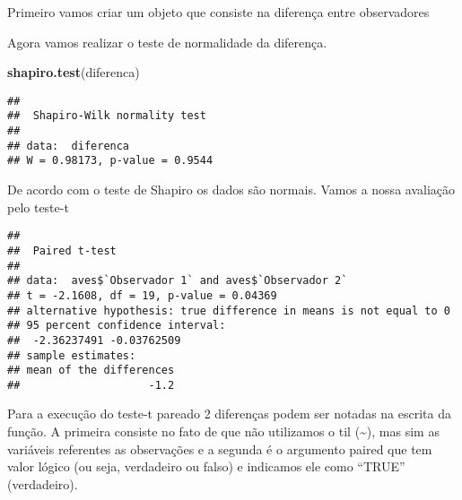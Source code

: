 \documentclass[]{book}
\newenvironment{Shaded}{\begin{snugshade}}{\end{snugshade}}
\newcommand{\DataTypeTok}[1]{\textcolor[rgb]{0.13,0.29,0.53}{#1}}
\newcommand{\FloatTok}[1]{\textcolor[rgb]{0.00,0.00,0.81}{#1}}
\newcommand{\KeywordTok}[1]{\textcolor[rgb]{0.13,0.29,0.53}{\textbf{#1}}}
\newcommand{\NormalTok}[1]{#1}
\newcommand{\OperatorTok}[1]{\textcolor[rgb]{0.81,0.36,0.00}{\textbf{#1}}}
\newcommand{\OtherTok}[1]{\textcolor[rgb]{0.56,0.35,0.01}{#1}}
\newcommand{\StringTok}[1]{\textcolor[rgb]{0.31,0.60,0.02}{#1}}
\begin{document}
Primeiro vamos criar um objeto que consiste na diferença entre observadores

\begin{Shaded}
\end{Shaded}

Agora vamos realizar o teste de normalidade da diferença.

\begin{Shaded}
\begin{Highlighting}[]
\KeywordTok{shapiro.test}\NormalTok{(diferenca)}
\end{Highlighting}
\end{Shaded}

\begin{verbatim}
## 
##  Shapiro-Wilk normality test
## 
## data:  diferenca
## W = 0.98173, p-value = 0.9544
\end{verbatim}

De acordo com o teste de Shapiro os dados são normais. Vamos a nossa avaliação pelo teste-t

\begin{Shaded}
\end{Shaded}

\begin{verbatim}
## 
##  Paired t-test
## 
## data:  aves$`Observador 1` and aves$`Observador 2`
## t = -2.1608, df = 19, p-value = 0.04369
## alternative hypothesis: true difference in means is not equal to 0
## 95 percent confidence interval:
##  -2.36237491 -0.03762509
## sample estimates:
## mean of the differences 
##                    -1.2
\end{verbatim}

Para a execução do teste-t pareado 2 diferenças podem ser notadas na escrita da função. A primeira consiste no fato de que não utilizamos o til (\textasciitilde{}), mas sim as variáveis referentes as observações e a segunda é o argumento paired que tem valor lógico (ou seja, verdadeiro ou falso) e indicamos ele como ``TRUE'' (verdadeiro).
\end{document}
